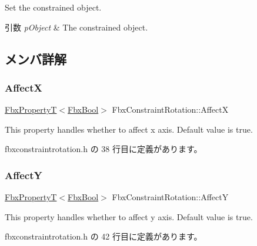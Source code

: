 Set the constrained object. 
\begin{DoxyParams}{引数}
{\em p\+Object} & The constrained object. \\
\hline
\end{DoxyParams}


\subsection{メンバ詳解}
\mbox{\label{class_fbx_constraint_rotation_a2fc6ae9614bcc41039d4abd37d3186aa}} 
\subsubsection{\texorpdfstring{AffectX}{AffectX}}
{\footnotesize\ttfamily \hyperlink{class_fbx_property_t}{Fbx\+PropertyT}$<$\hyperlink{fbxtypes_8h_a92e0562b2fe33e76a242f498b362262e}{Fbx\+Bool}$>$ Fbx\+Constraint\+Rotation\+::\+AffectX}

This property handles whether to affect x axis. Default value is true. 

 fbxconstraintrotation.\+h の 38 行目に定義があります。

\mbox{\label{class_fbx_constraint_rotation_a8b611c9fd76921a2780254dee0d33870}} 
\subsubsection{\texorpdfstring{AffectY}{AffectY}}
{\footnotesize\ttfamily \hyperlink{class_fbx_property_t}{Fbx\+PropertyT}$<$\hyperlink{fbxtypes_8h_a92e0562b2fe33e76a242f498b362262e}{Fbx\+Bool}$>$ Fbx\+Constraint\+Rotation\+::\+AffectY}

This property handles whether to affect y axis. Default value is true. 

 fbxconstraintrotation.\+h の 42 行目に定義があります。

\mbox{\label{class_fbx_constraint_rotation_af7a3d171bfeb0e5fa72d292756c64848}} 

